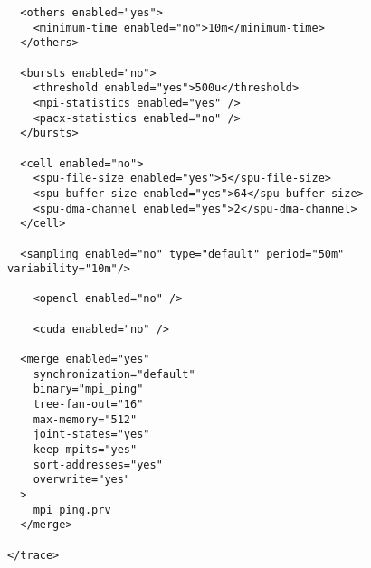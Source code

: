 \begin{verbatim}
  <others enabled="yes">
    <minimum-time enabled="no">10m</minimum-time>
  </others>

  <bursts enabled="no">
    <threshold enabled="yes">500u</threshold>
    <mpi-statistics enabled="yes" />
    <pacx-statistics enabled="no" />
  </bursts>

  <cell enabled="no">
    <spu-file-size enabled="yes">5</spu-file-size>
    <spu-buffer-size enabled="yes">64</spu-buffer-size>
    <spu-dma-channel enabled="yes">2</spu-dma-channel>
  </cell>

  <sampling enabled="no" type="default" period="50m" variability="10m"/>

	<opencl enabled="no" />

	<cuda enabled="no" />

  <merge enabled="yes" 
    synchronization="default"
    binary="mpi_ping"
    tree-fan-out="16"
    max-memory="512"
    joint-states="yes"
    keep-mpits="yes"
    sort-addresses="yes"
    overwrite="yes"
  >
    mpi_ping.prv 
  </merge>

</trace>
\end{verbatim}
